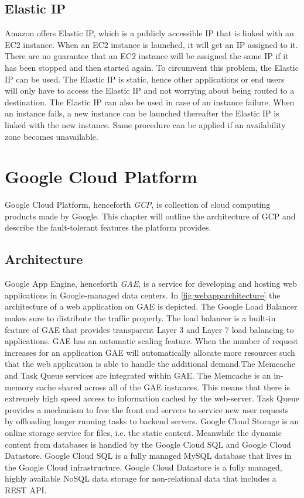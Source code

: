 \documentclass[11pt]{report}
\begin{document}
\section{Elastic IP}
Amazon offers Elastic IP, which is a publicly accessible IP that is linked with an EC2 instance. When an EC2 instance is launched, it will get an IP assigned to it. There are no guarantee that an EC2 instance will be assigned the same IP if it has been stopped and then started again. To circumvent this problem, the Elastic IP can be used. The Elastic IP is static, hence other applications or end users will only have to access the Elastic IP and not worrying about being routed to a destination. The Elastic IP can also be used in case of an instance failure. When an instance fails, a new instance can be launched thereafter the Elastic IP is linked with the new instance. Same procedure can be applied if an availability zone becomes unavailable.




\chapter{Google Cloud Platform}
Google Cloud Platform, henceforth \emph{GCP}, is collection of cloud computing products made by Google. This chapter will outline the architecture of GCP and describe the fault-tolerant features the platform provides.

\section{Architecture}
Google App Engine, henceforth \emph{GAE}, is a service for developing and hosting web applications in Google-managed data centers. In \autoref{fig:webapparchitecture} the architecture of a web application on GAE is depicted. The Google Load Balancer makes sure to distribute the traffic properly. The load balancer is a built-in feature of GAE that provides transparent Layer 3 and Layer 7 load balancing to applications. GAE has an automatic scaling feature. When the number of request increases for an application GAE will automatically allocate more resources such that the web application is able to handle the additional demand.The Memcache and Task Queue services are integrated within GAE. The Memcache is an in-memory cache shared across all of the GAE instances. This means that there is extremely high speed access to information cached by the web-server. Task Queue provides a mechanism to free the front end servers to service new user requests by offloading longer running tasks to backend servers. Google Cloud Storage is an online storage service for files, i.e. the static content. Meanwhile the dynamic content from databases is handled by the Google Cloud SQL and Google Cloud Datastore. Google Cloud SQL is a fully managed MySQL database that lives in the Google Cloud infrastructure. Google Cloud Datastore is a fully managed, highly available NoSQL data storage for non-relational data that includes a REST API.
\end{document}
